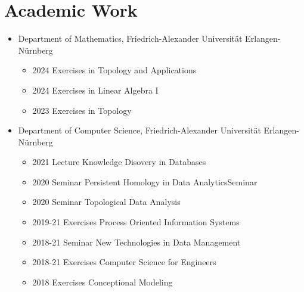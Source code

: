 \documentclass[a4paper,12pt]{article}
\newcommand{\years}[1]{\marginnote{\scriptsize #1}}
\begin{document}
\newpage
\section*{Academic Work}
\years{Teaching}
\vspace{-2pt}
\begin{itemize}[noitemsep, leftmargin=*]
    \item Department of Mathematics, Friedrich-Alexander Universität Erlangen-Nürnberg
          \begin{itemize}
            \item 2024 Exercises in Topology and Applications
            \item 2024 Exercises in Linear Algebra I
            \item 2023 Exercises in Topology
          \end{itemize}
    \item Department of Computer Science, Friedrich-Alexander Universität Erlangen-Nürnberg
          \begin{itemize}
            \item 2021 Lecture Knowledge Disovery in Databases
            \item 2020 Seminar Persistent Homology in Data AnalyticsSeminar 
            \item 2020 Seminar Topological Data Analysis
            \item 2019-21 Exercises Process Oriented Information Systems
            \item 2018-21 Seminar New Technologies in Data Management
            \item 2018-21 Exercises Computer Science for Engineers
            \item 2018 Exercises Conceptional Modeling
          \end{itemize}
\end{itemize}
\vspace{10pt}
\end{document}
